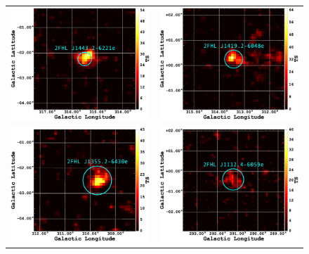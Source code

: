 \begin{figure}[ht]
	\begin{center}
		\begin{tabular}{ll}
			\includegraphics[width=8cm]{Figures/l315_b0_ES_3_residTSmap_2FHL_zoom.eps} &
			\includegraphics[width=8cm]{Figures/l315_b0_ES_4_residTSmap_2FHL_zoom.eps}\\
			\includegraphics[width=8cm]{Figures/l315_b0_ES_1_residTSmap_2FHL_zoom.eps} &
			\includegraphics[width=8cm]{Figures/l290_b0_ES_1_residTSmap_2FHL_zoom.eps} \\

\end{tabular}
\end{center}
\end{figure}
